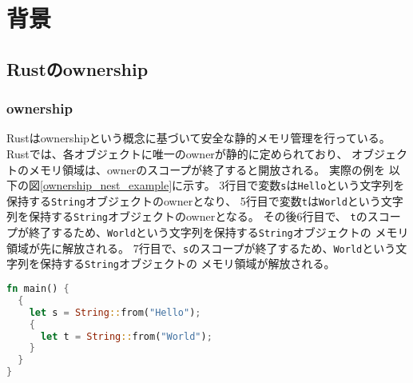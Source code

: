 \documentclass{sumiilab-paper}
\theoremstyle{mystyle}
\numberwithin{definition}{chapter} %
\begin{document}

\chapter{背景}

\section{Rustのownership}

\subsection{ownership}
Rustはownershipという概念に基づいて安全な静的メモリ管理を行っている。
Rustでは、各オブジェクトに唯一のownerが静的に定められており、
オブジェクトのメモリ領域は、ownerのスコープが終了すると開放される。
実際の例を
以下の図\ref{ownership_nest_example}に示す。
3行目で変数\texttt{s}は\texttt{Hello}という文字列を保持する\texttt{String}オブジェクトのownerとなり、
5行目で変数\texttt{t}は\texttt{World}という文字列を保持する\texttt{String}オブジェクトのownerとなる。
その後6行目で、
\texttt{t}のスコープが終了するため、\texttt{World}という文字列を保持する\texttt{String}オブジェクトの
メモリ領域が先に解放される。
7行目で、\texttt{s}のスコープが終了するため、\texttt{World}という文字列を保持する\texttt{String}オブジェクトの
メモリ領域が解放される。
\begin{lstlisting}[language=Rust,caption=ownershipによるメモリ管理,label=ownership_nest_example, captionpos=b]
fn main() {
  {
    let s = String::from("Hello");
    {
      let t = String::from("World");
    }
  }
}
\end{lstlisting}
\end{document}

